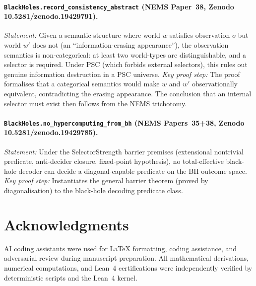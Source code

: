 \documentclass[11pt,twocolumn]{article}
\theoremstyle{remark}
\begin{document}
\paragraph{\texttt{BlackHoles.record\_consistency\_abstract} (NEMS Paper~38,
Zenodo 10.5281/zenodo.19429791).}
\textit{Statement:} Given a semantic structure where world $w$ satisfies
observation $o$ but world $w'$ does not (an ``information-erasing
appearance''), the observation semantics is non-categorical: at least
two world-types are distinguishable, and a selector is required.
Under PSC (which forbids external selectors), this rules out genuine
information destruction in a PSC universe.
\textit{Key proof step:} The proof formalises that a categorical
semantics would make $w$ and $w'$ observationally equivalent, contradicting
the erasing appearance. The conclusion that an internal selector must
exist then follows from the NEMS trichotomy.

\paragraph{\texttt{BlackHoles.no\_hypercomput\allowbreak ing\_from\_bh} (NEMS Papers~35+38,
Zenodo 10.5281/zenodo.19429785).}
\textit{Statement:} Under the SelectorStrength barrier premises
(extensional nontrivial predicate, anti-decider closure, fixed-point
hypothesis), no total-effective black-hole decoder can decide a
diagonal-capable predicate on the BH outcome space.
\textit{Key proof step:} Instantiates the general
barrier theorem (proved by diagonalisation) to the black-hole decoding
predicate class.





\section*{Acknowledgments}

AI coding assistants were used for LaTeX formatting, coding assistance, and adversarial review during manuscript preparation. All mathematical derivations, numerical computations, and Lean~4 certifications were independently verified by deterministic scripts and the Lean~4 kernel.
\end{document}
